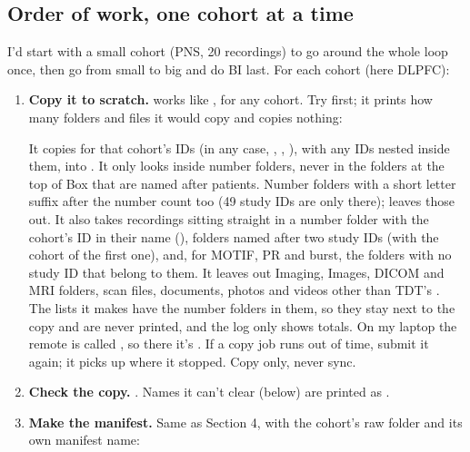 \subsection{Order of work, one cohort at a time}
I'd start with a small cohort (PNS, 20 recordings) to go around the whole loop once, then go from small to big and do BI last. For each cohort (here DLPFC):
\begin{enumerate}
  \item \textbf{Copy it to scratch.}  works like , for any cohort. Try  first; it prints how many folders and files it would copy and copies nothing:
  It copies  for that cohort's IDs (in any case, , , ), with any IDs nested inside them, into . It only looks inside number folders, never in the folders at the top of Box that are named after patients. Number folders with a short letter suffix after the number count too (49 study IDs are only there);  leaves those out. It also takes recordings sitting straight in a number folder with the cohort's ID in their name (), folders named after two study IDs (with the cohort of the first one), and, for MOTIF, PR and burst, the folders with no study ID that belong to them. It leaves out Imaging, Images, DICOM and MRI folders, scan files, documents, photos and videos other than TDT's . The lists it makes have the number folders in them, so they stay next to the copy and are never printed, and the log only shows totals. On my laptop the remote is called , so there it's . If a copy job runs out of time, submit it again; it picks up where it stopped. Copy only, never sync.
  \item \textbf{Check the copy.} . Names it can't clear (below) are printed as .
  \item \textbf{Make the manifest.} Same as Section 4, with the cohort's raw folder and its own manifest name:

\end{enumerate}
